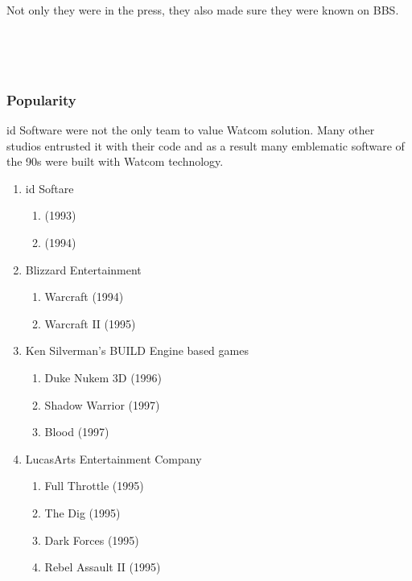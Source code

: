 \vspace{-4mm}
Not only they were in the press, they also made sure they were known on BBS.\\
\par
{}\\
\par
{}\\


\subsubsection{Popularity}
id Software were not the only team to value Watcom solution. Many other studios entrusted it with their code and as a result many emblematic software of the 90s were built with Watcom technology.\\
\begin{enumerate}
\item id Softare 
       \begin{enumerate}
       \item \doom{} (1993)
       \item \doomii{} (1994)
       \end{enumerate} 
\item Blizzard Entertainment 
       \begin{enumerate}
       \item Warcraft (1994)
       \item Warcraft II (1995)
       \end{enumerate}
\item Ken Silverman's BUILD Engine based games
      \begin{enumerate}
       \item Duke Nukem 3D (1996)
       \item Shadow Warrior (1997)
       \item Blood (1997)
       \end{enumerate}
\item LucasArts Entertainment Company
      \begin{enumerate}
       \item Full Throttle (1995)
       \item The Dig (1995)
       \item Dark Forces  (1995)
       \item Rebel Assault II  (1995)    
      \end{enumerate}
\end{enumerate}
\par


